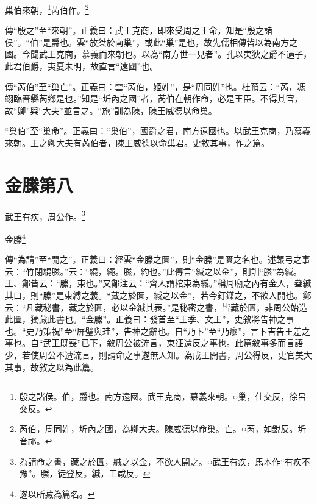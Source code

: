 巢伯來朝，\footnote{殷之諸侯。伯，爵也。南方遠國。武王克商，慕義來朝。○巢，仕交反，徐呂交反。}芮伯作。\footnote{芮伯，周同姓，圻內之國，為卿大夫。陳威德以命巢。亡。○芮，如銳反。圻音祁。}


{\noindent\zhuan{}\fzbyks 傳“殷之”至“來朝”。正義曰：武王克商，即來受周之王命，知是“殷之諸侯”。“伯”是爵也。雲“放桀於南巢”，或此“巢”是也，故先儒相傳皆以為南方之國。今聞武王克商，慕義而來朝也。以為“南方世一見者”。孔以夷狄之爵不過子，此君伯爵，夷夏未明，故直言“遠國”也。 \par}

{\noindent\zhuan{}\fzbyks 傳“芮伯”至“巢亡”。正義曰：雲“芮伯，姬姓”，是“周同姓”也。杜預云：“芮，馮翊臨晉縣芮鄉是也。”知是“圻內之國”者，芮伯在朝作命，必是王臣。不得其官，故“卿”與“大夫”並言之。“旅”訓為陳，陳王威德以命巢。 \par}

{\noindent\shu{}\fzkt “巢伯”至“巢命”。正義曰：“巢伯”，國爵之君，南方遠國也。以武王克商，乃慕義來朝。王之卿大夫有芮伯者，陳王威德以命巢君。史敘其事，作之篇。 \par}

\section{金縢第八}


武王有疾，周公作。\footnote{為請命之書，藏之於匱，緘之以金，不欲人開之。○武王有疾，馬本作“有疾不豫”。縢，徒登反。緘，工咸反。}

金縢\footnote{遂以所藏為篇名。}

{\noindent\zhuan{}\fzbyks 傳“為請”至“開之”。正義曰：經雲“金縢之匱”，則“金縢”是匱之名也。述韔弓之事云：“竹閉緄縢。”云：“緄，繩。縢，約也。”此傳言“緘之以金”，則訓“縢”為緘。王、鄭皆云：“縢，束也。”又鄭注云：“齊人謂棺束為緘。”稱周廟之內有金人，叄緘其口，則“縢”是束縛之義。“藏之於匱，緘之以金”，若今釘鐷之，不欲人開也。鄭云：“凡藏秘書，藏之於匱，必以金緘其表。”是秘密之書，皆藏於匱，非周公始造此匱，獨藏此書也。“金縢”。正義曰：發首至“王季、文王”，史敘將告神之事也。“史乃策祝”至“屏璧與珪”，告神之辭也。自“乃卜”至“乃瘳”，言卜吉告王差之事也。自“武王既喪”已下，敘周公被流言，東征還反之事也。此篇敘事多而言語少，若使周公不遭流言，則請命之事遂無人知。為成王開書，周公得反，史官美大其事，故敘之以為此篇。 \par}

